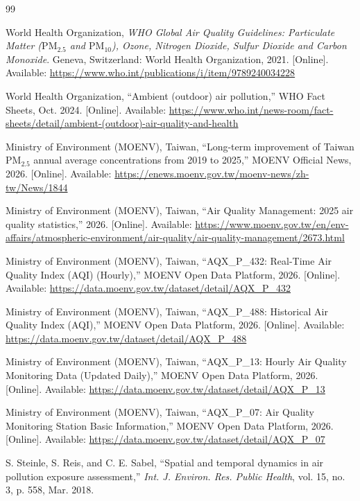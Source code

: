 \begin{thebibliography}{99}

World Health Organization, \emph{WHO Global Air Quality Guidelines: Particulate Matter ($\text{PM}_{2.5}$ and $\text{PM}_{10}$), Ozone, Nitrogen Dioxide, Sulfur Dioxide and Carbon Monoxide}. Geneva, Switzerland: World Health Organization, 2021. [Online]. Available: \url{https://www.who.int/publications/i/item/9789240034228}

World Health Organization, ``Ambient (outdoor) air pollution,'' WHO Fact Sheets, Oct. 2024. [Online]. Available: \url{https://www.who.int/news-room/fact-sheets/detail/ambient-(outdoor)-air-quality-and-health}

Ministry of Environment (MOENV), Taiwan, ``Long-term improvement of Taiwan $\text{PM}_{2.5}$ annual average concentrations from 2019 to 2025,'' MOENV Official News, 2026. [Online]. Available: \url{https://enews.moenv.gov.tw/moenv-news/zh-tw/News/1844}

Ministry of Environment (MOENV), Taiwan, ``Air Quality Management: 2025 air quality statistics,'' 2026. [Online]. Available: \url{https://www.moenv.gov.tw/en/env-affairs/atmospheric-environment/air-quality/air-quality-management/2673.html}

Ministry of Environment (MOENV), Taiwan, ``AQX\_P\_432: Real-Time Air Quality Index (AQI) (Hourly),'' MOENV Open Data Platform, 2026. [Online]. Available: \url{https://data.moenv.gov.tw/dataset/detail/AQX_P_432}

Ministry of Environment (MOENV), Taiwan, ``AQX\_P\_488: Historical Air Quality Index (AQI),'' MOENV Open Data Platform, 2026. [Online]. Available: \url{https://data.moenv.gov.tw/dataset/detail/AQX_P_488}

Ministry of Environment (MOENV), Taiwan, ``AQX\_P\_13: Hourly Air Quality Monitoring Data (Updated Daily),'' MOENV Open Data Platform, 2026. [Online]. Available: \url{https://data.moenv.gov.tw/dataset/detail/AQX_P_13}

Ministry of Environment (MOENV), Taiwan, ``AQX\_P\_07: Air Quality Monitoring Station Basic Information,'' MOENV Open Data Platform, 2026. [Online]. Available: \url{https://data.moenv.gov.tw/dataset/detail/AQX_P_07}

S. Steinle, S. Reis, and C. E. Sabel, ``Spatial and temporal dynamics in air pollution exposure assessment,'' \emph{Int. J. Environ. Res. Public Health}, vol. 15, no. 3, p. 558, Mar. 2018.


\end{thebibliography}
